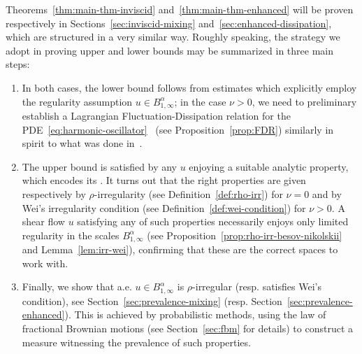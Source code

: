 \documentclass[11pt,oneside,reqno]{amsart}
\newcommand{\tmtextit}[1]{\text{{\itshape{#1}}}}
\newenvironment{enumeratenumeric}{\begin{enumerate}[1.] }{\end{enumerate}}
\numberwithin{equation}{section}
\begin{document}
Theorems~\ref{thm:main-thm-inviscid} and~\ref{thm:main-thm-enhanced} will be
proven respectively in Sections~\ref{sec:inviscid-mixing}
and~\ref{sec:enhanced-dissipation}, which are structured in a very similar
way. Roughly speaking, the strategy we adopt in proving upper and lower bounds
may be summarized in three main steps:
\begin{enumeratenumeric}
  \item In both cases, the lower bound follows from estimates which explicitly
  employ the regularity assumption $u \in B^{\alpha}_{1, \infty}$; in the case
  $\nu > 0$, we need to preliminary establish a Lagrangian
  Fluctuation-Dissipation relation for the PDE~\eqref{eq:harmonic-oscillator}
  \ (see Proposition~\ref{prop:FDR}) similarly in spirit to what was done
  in~{\cite{zelatidrivas}}.
  
  \item The upper bound is satisfied by any $u$ enjoying a suitable analytic
  property, which encodes its \tmtextit{irregularity}. It turns out that the
  right properties are given respectively by $\rho$-irregularity (see
  Definition~\ref{def:rho-irr}) for $\nu = 0$ and by Wei's irregularity
  condition (see Definition~\ref{def:wei-condition}) for $\nu > 0$. A shear
  flow $u$ satisfying any of such properties necessarily enjoys only limited
  regularity in the scales $B^{\alpha}_{1, \infty}$ (see
  Proposition~\ref{prop:rho-irr-besov-nikolskii} and
  Lemma~\ref{lem:irr-wei}), confirming that these are the correct spaces to
  work with.
  
  \item Finally, we show that a.e. $u \in B^{\alpha}_{1, \infty}$ is
  $\rho$-irregular (resp. satisfies Wei's condition), see
  Section~\ref{sec:prevalence-mixing} (resp.
  Section~\ref{sec:prevalence-enhanced}). This is achieved by probabilistic
  methods, using the law of fractional Brownian motions (see
  Section~\ref{sec:fbm} for details) to construct a measure witnessing the
  prevalence of such properties.
\end{enumeratenumeric}
\end{document}
